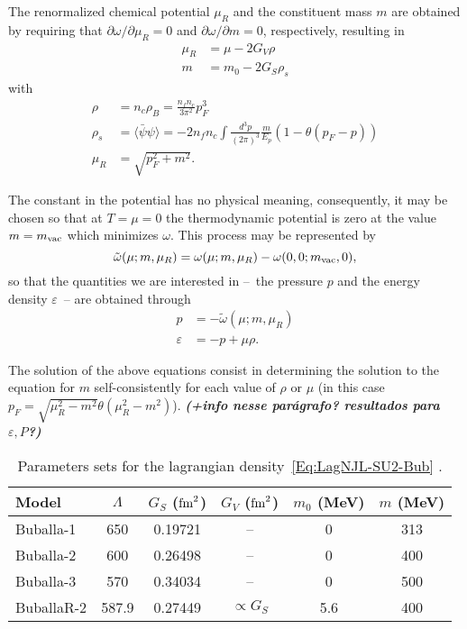 \documentclass[prc, reprint, amsmath, floatfix, linenumbers,10pt]{revtex4-1}
\newcommand{\comment}[1]{{\bf\textit{#1}}}
\begin{document}
The renormalized chemical potential $\mu_R$ and the constituent mass $m$ are obtained by requiring that $\partial \omega / \partial \mu_R = 0$ and $\partial \omega / \partial m = 0$, respectively, resulting in
\begin{align}
	\mu_R &= \mu - 2 G_V \rho \\
	m &= m_0 - 2 G_S \rho_s
\end{align}
%
with
\begin{align}
	\rho &= n_c \rho_B = \frac{n_f n_c}{3\pi^2} p_F^3 \\
	\rho_s &= \langle \bar\psi\psi\rangle = - 2 n_f n_c \int\frac{d^3p}{(2\pi)^3} \frac{m}{E_p}(1 - \theta(p_F - p)) \\
	\mu_R &= \sqrt{p_F^2 + m^2}.
\end{align}

The constant in the potential has no physical meaning, consequently, it may be chosen so that at $T = \mu = 0$ the thermodynamic potential is zero at the value $m = m_{\rm{vac}}$ which minimizes $\omega$. This process may be represented by 
\begin{equation}
	\tilde\omega(\mu; m, \mu_R) = \omega(\mu; m, \mu_R) - \omega(0, 0; m_{\rm{vac}}, 0),
\end{equation}
%
so that the quantities we are interested in --~the pressure $p$ and the energy density $\varepsilon$~-- are obtained through
\begin{align}
		p &= -\tilde\omega(\mu; m, \mu_R) \label{Exp_pressao_T}\\
		\varepsilon &= -p + \mu \rho. \label{Exp_energia_T}
\end{align}
	
The solution of the above equations consist in determining the solution to the equation for $m$ self-consistently for each value of $\rho$ or $\mu$ (in this case $p_F = \sqrt{\mu_R^2 - m^2}\theta(\mu_R^2 - m^2)$). \comment{(+info nesse parágrafo? resultados para $\varepsilon, P$?)}

\begin{table}[!htpb]
\centering
\caption{Parameters sets for the lagrangian density~\eqref{Eq:LagNJL-SU2-Bub} \cite{Buballa1996, Buballa2005}. \label{Tab:Parametros_NJL}}
\begin{ruledtabular}
\begin{tabular}{lccccc}
Model &  $\Lambda$ & $G_S$ ($\rm{fm}^2$) & $G_V$ ($\rm{fm}^2$) & $m_0$ (MeV) & $m$ (MeV) \\
\hline
Buballa-1 & 650 & 0.19721 & -- & 0 & 313 \\
Buballa-2 & 600 & 0.26498 & -- & 0 & 400 \\
Buballa-3 & 570 & 0.34034 & -- & 0 & 500 \\
BuballaR-2 & 587.9 & 0.27449 & $\propto G_S$ & 5.6 & 400 \\
\end{tabular}
\end{ruledtabular}
\end{table}
\end{document}
